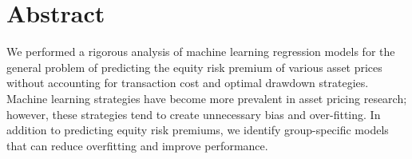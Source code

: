 %
\vspace*{-10mm}
\section*{Abstract}
\large 
We performed a rigorous analysis of machine learning regression models for the general problem of predicting the equity risk premium of various asset prices without accounting for transaction cost and optimal drawdown strategies. Machine learning strategies have become more prevalent in asset pricing research; however, these strategies tend to create unnecessary bias and over-fitting. In addition to predicting equity risk premiums, we identify group-specific models that can reduce overfitting and improve performance.

